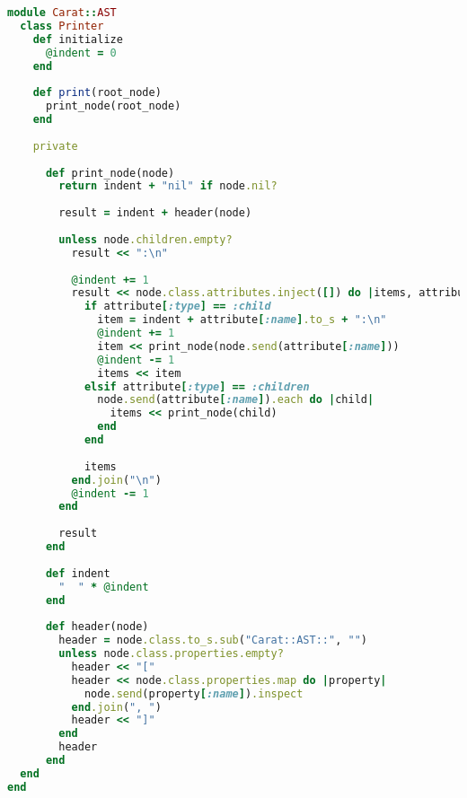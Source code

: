 \begin{lstlisting}[title={\small\ttfamily\bfseries ast/printer.rb},language=Ruby]
module Carat::AST
  class Printer
    def initialize
      @indent = 0
    end
    
    def print(root_node)
      print_node(root_node)
    end
    
    private
    
      def print_node(node)
        return indent + "nil" if node.nil?
        
        result = indent + header(node)
        
        unless node.children.empty?
          result << ":\n"
          
          @indent += 1
          result << node.class.attributes.inject([]) do |items, attribute|
            if attribute[:type] == :child
              item = indent + attribute[:name].to_s + ":\n"
              @indent += 1
              item << print_node(node.send(attribute[:name]))
              @indent -= 1
              items << item
            elsif attribute[:type] == :children
              node.send(attribute[:name]).each do |child|
                items << print_node(child)
              end
            end
            
            items
          end.join("\n")
          @indent -= 1
        end
        
        result
      end
      
      def indent
        "  " * @indent
      end
      
      def header(node)
        header = node.class.to_s.sub("Carat::AST::", "")
        unless node.class.properties.empty?
          header << "["
          header << node.class.properties.map do |property|
            node.send(property[:name]).inspect
          end.join(", ")
          header << "]"
        end
        header
      end
  end
end

\end{lstlisting}

